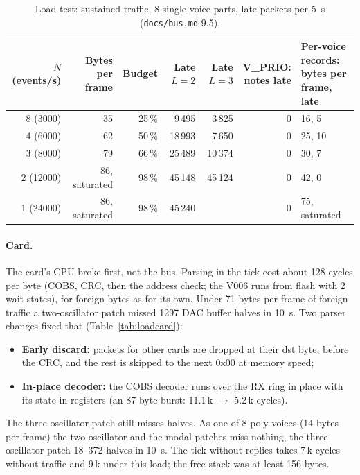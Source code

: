 \documentclass[11pt,a4paper]{article}
\newcommand{\file}[1]{\texttt{#1}}
\begin{document}
\begin{table}[htbp]
\centering\small
\caption{Load test: sustained traffic, 8 single-voice parts, late packets per \SI{5}{s} (\file{docs/bus.md}
9.5).}\label{tab:loadsust}
\setlength{\tabcolsep}{4pt}
\begin{tabular}{@{}r r r r r r l@{}}
\toprule
\shortstack[r]{$N$\\(events/s)} & \shortstack[r]{Bytes\\per frame} & Budget & \shortstack[r]{Late\\$L = 2$} &
\shortstack[r]{Late\\$L = 3$} & \shortstack[r]{V\_PRIO:\\notes late} & \shortstack[l]{Per-voice records:\\bytes per
frame, late} \\
\midrule
8 (3000) & 35 & 25\,\% & 9\,495 & 3\,825 & 0 & 16, 5 \\
4 (6000) & 62 & 50\,\% & 18\,993 & 7\,650 & 0 & 25, 10 \\
3 (8000) & 79 & 66\,\% & 25\,489 & 10\,374 & 0 & 30, 7 \\
2 (12000) & 86, saturated & 98\,\% & 45\,148 & 45\,124 & 0 & 42, 0 \\
1 (24000) & 86, saturated & 98\,\% & 45\,240 & & 0 & 75, saturated \\
\bottomrule
\end{tabular}
\end{table}

\paragraph{Card.} The card's CPU broke first, not the bus. Parsing in the tick cost about 128 cycles per byte (COBS,
CRC, then the address check; the V006 runs from flash with 2 wait states), for foreign bytes as for its own. Under
71 bytes per frame of foreign traffic a two-oscillator patch missed 1297 DAC buffer halves in \SI{10}{s}. Two parser
changes fixed that (Table~\ref{tab:loadcard}):
\begin{itemize}
  \item \textbf{Early discard:} packets for other cards are dropped at their dst byte, before the CRC, and the rest is
    skipped to the next 0x00 at memory speed;
  \item \textbf{In-place decoder:} the COBS decoder runs over the RX ring in place with its state in registers (an
    87-byte burst: 11.1\,k $\to$ 5.2\,k cycles).
\end{itemize}
The three-oscillator patch still misses halves. As one of 8 poly voices (14 bytes per frame) the two-oscillator and
the modal patches miss nothing, the three-oscillator patch 18--372 halves in \SI{10}{s}. The tick without replies takes
7\,k cycles without traffic and 9\,k under this load; the free stack was at least 156 bytes.
\end{document}
